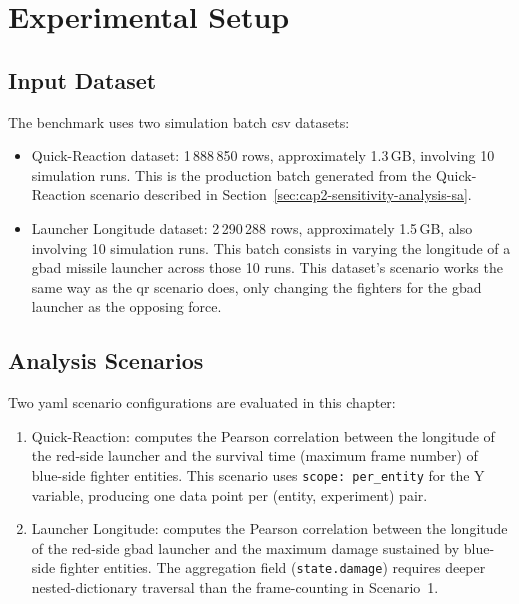 \section{Experimental Setup}
\label{sec:eval-setup}

\subsection{Input Dataset}
\label{subsec:eval-datasets}

The benchmark uses two simulation batch \gls{csv} datasets:

\begin{itemize}
    \item Quick-Reaction dataset:
          1\,888\,850 rows, approximately 1.3\,GB, involving 10 simulation runs.
          This is the production batch generated from the Quick-Reaction scenario
          described in Section~\ref{sec:cap2-sensitivity-analysis-sa}.
    \item Launcher Longitude dataset:
          2\,290\,288 rows, approximately 1.5\,GB, also involving 10 simulation runs.
          This batch consists in varying the longitude of a \gls{gbad} missile launcher
          across those 10 runs. This dataset's scenario works the same way as the
          \gls{qr} scenario does, only changing the fighters for the \gls{gbad}
          launcher as the opposing force.
\end{itemize}

\subsection{Analysis Scenarios}
\label{subsec:eval-scenarios}

Two \gls{yaml} scenario configurations are evaluated in this chapter:

\begin{enumerate}
    \item Quick-Reaction: computes the Pearson
          correlation between the longitude of the red-side launcher and the survival time
          (maximum frame number) of blue-side fighter entities.  This scenario uses
          \texttt{scope: per\_entity} for the Y variable, producing one data point per
          (entity, experiment) pair.
    \item Launcher Longitude: computes the
          Pearson correlation between the longitude of the red-side \gls{gbad} launcher and
          the maximum damage sustained by blue-side fighter entities.  The
          aggregation field (\texttt{state.damage}) requires deeper nested-dictionary
          traversal than the frame-counting in Scenario~1.
\end{enumerate}


